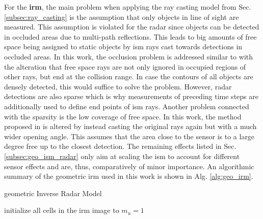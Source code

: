 For the \textbf{\gls{irm}}, the main problem when applying the ray casting model from Sec. \ref{subsec:ray_casting} is the assumption that only objects in line of sight are measured. This assumption is violated for the radar since objects can be detected in occluded areas due to multi-path reflections. This leads to big amounts of free space being assigned to static objects by \gls{ism} rays cast towards detections in occluded areas. In this work, the occlusion problem is addressed similar to \cite{werber2015automotive} with the alteration that free space rays are not only ignored in occupied regions of other rays, but end at the collision range. In case the contours of all objects are densely detected, this would suffice to solve the problem. However, radar detections are also sparse which is why measurements of preceding time steps are additionally used to define end points of \gls{ism} rays. Another problem connected with the sparsity is the low coverage of free space. In this work, the method proposed in \cite{prophet2018adaptions} is altered by instead casting the original rays again but with a much wider opening angle. This assumes that the area close to the sensor is to a large degree free up to the closest detection. The remaining effects listed in Sec. \ref{subsec:geo_ism_radar} only aim at scaling the \gls{ism} to account for different sensor effects and are, thus, comparatively of minor importance. An algorithmic summary of the geometric \gls{irm} used in this work is shown in Alg. \ref{alg:geo_irm}.
\begin{algorithm}
	\caption{\label{alg:geo_irm}geometric Inverse Radar Model}
	initialize all cells in the \gls{irm} image to $m_u=1$\;
\end{algorithm}
%
